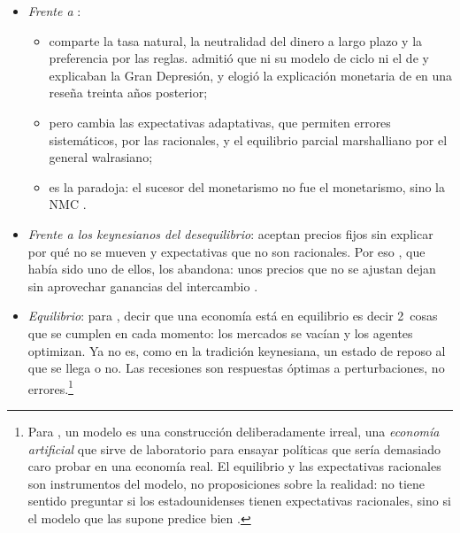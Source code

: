 \documentclass[11pt]{article}
\begin{document}
\begin{itemize}
\item \emph{Frente a }:
  \begin{itemize}
  \item comparte la tasa natural, la neutralidad del dinero a largo plazo y la preferencia por las reglas.  admitió que ni su modelo de ciclo ni el de  y  explicaban la Gran Depresión, y elogió la explicación monetaria de \textcite{FriedmanSchwartz1963Monetary} en una reseña treinta años posterior\nocite{Lucas1994Review};
  \item pero cambia las expectativas adaptativas, que permiten errores sistemáticos, por las racionales, y el equilibrio parcial marshalliano por el general walrasiano;
  \item es la paradoja\nocite{DeVroey2016History}: el sucesor del monetarismo no fue el monetarismo, sino la NMC .
  \end{itemize}
\item \emph{Frente a los keynesianos del desequilibrio}: aceptan precios fijos sin explicar por qué no se mueven y expectativas que no son racionales. Por eso \textcite{Barro1979Second}, que había sido uno de ellos, los abandona: unos precios que no se ajustan dejan sin aprovechar ganancias del intercambio .
\item \emph{Equilibrio}: para \textcite{LucasSargent1979After}, decir que una economía está en equilibrio es decir 2~cosas que se cumplen en cada momento: los mercados se vacían y los agentes optimizan. Ya no es, como en la tradición keynesiana, un estado de reposo al que se llega o no\nocite{DeVroey2016History}. Las recesiones son respuestas óptimas a perturbaciones, no errores.\footnote{Para , un modelo es una construcción deliberadamente irreal, una \emph{economía artificial} que sirve de laboratorio para ensayar políticas que sería demasiado caro probar en una economía real\nocite{Lucas1980Methods}. El equilibrio y las expectativas racionales son instrumentos del modelo, no proposiciones sobre la realidad: no tiene sentido preguntar si los estadounidenses tienen expectativas racionales, sino si el modelo que las supone predice bien\nocite{DeVroey2016History} .}
\end{itemize}
\end{document}
